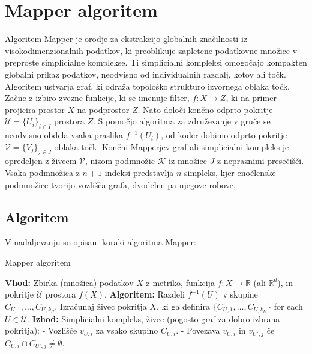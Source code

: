 \chapter{Mapper algoritem}
Algoritem Mapper je orodje za ekstrakcijo globalnih značilnosti iz visokodimenzionalnih podatkov, ki preoblikuje zapletene podatkovne množice v preproste simplicialne komplekse. Ti simplicialni kompleksi omogočajo kompakten globalni prikaz podatkov, neodvisno od individualnih razdalj, kotov ali točk. 
Algoritem ustvarja graf, ki odraža topološko strukturo izvornega oblaka točk. Začne z izbiro zvezne funkcije, ki se imenuje filter, $f : X \rightarrow Z$, ki na primer projicira prostor $X$ na podprostor $Z$. Nato določi končno odprto pokritje $\mathcal{U} = \{U_i\}_{i \in I}$ prostora $Z$. S pomočjo algoritma za združevanje v gruče se neodvisno obdela vsaka praslika $f^{-1}(U_i)$, od koder dobimo odprto pokritje $\mathcal{V} = \{V_j\}_{j \in J}$ oblaka točk. Končni Mapperjev graf ali simplicialni kompleks je opredeljen z živcem $\mathcal{V}$, nizom podmnožic $\mathcal{K}$ iz množice $J$ z nepraznimi presečišči. Vsaka podmnožica z $n+1$ indeksi predstavlja $n$-simpleks, kjer enočlenske podmnožice tvorijo vozlišča grafa, dvodelne pa njegove robove.
\begin{comment}
    https://danedmiston.github.io/home_page/assets/Mapper.pdf
\end{comment}

\cite{Langenbahn2022}
\section{Algoritem}
V nadaljevanju so opisani koraki algoritma Mapper:
\begin{algorithm}
\caption{Mapper algoritem}\label{alg:cap}
\begin{algorithmic}
\State \textbf{Vhod:} Zbirka (množica) podatkov $X$ z metriko, funkcija $f: X \rightarrow \mathbb{R}$ (ali $\mathbb{R}^d$), in pokritje $\mathcal{U}$ prostora $f(X)$.
\State \textbf{Algoritem:}
    \State Razdeli $f^{-1}(U)$  v skupine $C_{U,1}, \ldots, C_{U,k_U}$.
    \State Izračunaj živec pokritja $X$, ki ga definira $\{C_{U,1}, \ldots, C_{U,k_U}\}$ for each $U \in \mathcal{U}$.
\EndFor
\State \textbf{Izhod:} Simplicialni kompleks, živec (pogosto graf za dobro izbrana pokritja):
\State \quad - Vozlišče $v_{U,i}$ za vsako skupino $C_{U,i}$.
\State \quad - Povezava $v_{U,i}$ in $v_{U',j}$ če $C_{U,i} \cap C_{U',j} \neq \emptyset$.
\end{algorithmic}
\end{algorithm}
